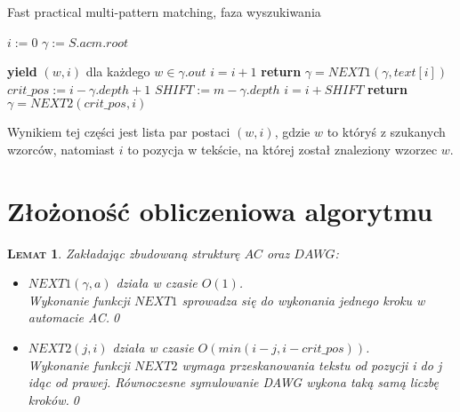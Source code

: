 \documentclass[a4paper,11pt]{article}
\newtheorem{LEM}[DEF]{\textsc{Lemat}}
\begin{document}
\begin{algorithm}
\caption{Fast practical multi-pattern matching, faza wyszukiwania}
\begin{algorithmic}[1]
 
\State $i := 0$ 
\State $\gamma := S.acm.root$ 

 
     
            \State \textbf{yield} $(w, i)$ dla każdego $w \in \gamma{.out}$
        \EndIf
        \State $i = i + 1$
            \State \textbf{return}
        \EndIf
        \State $\gamma = NEXT1(\gamma, text[i])$  
    \EndWhile
    \State $crit\_pos := i - \gamma{.depth} + 1$ 
    \State $SHIFT := m - \gamma{.depth}$ 
    \State $i = i + SHIFT$ 
        \State \textbf{return}
    \EndIf
    \State $\gamma = NEXT2(crit\_pos, i)$ 
\EndWhile
\EndProcedure
\end{algorithmic}
\end{algorithm}

Wynikiem tej części jest lista par postaci $(w, i)$, gdzie $w$ to któryś z szukanych wzorców, natomiast $i$ to pozycja w tekście, na której został znaleziony wzorzec $w$.

\section{Złożoność obliczeniowa algorytmu}

\begin{LEM}
Zakładając zbudowaną strukturę $AC$ oraz $DAWG$:
\begin{itemize}
    \item $NEXT1(\gamma, a)$ działa w czasie $O(1)$. \\
        Wykonanie funkcji $NEXT1$ sprowadza się do wykonania jednego kroku w automacie AC.\qed
    \item $NEXT2(j, i)$ działa w czasie $O(min(i-j, i - crit\_pos))$. \\
        Wykonanie funkcji $NEXT2$ wymaga przeskanowania tekstu od pozycji i do j idąc od prawej. Równoczesne symulowanie DAWG wykona taką samą liczbę kroków.\qed
\end{itemize}
\end{LEM}
\end{document}
